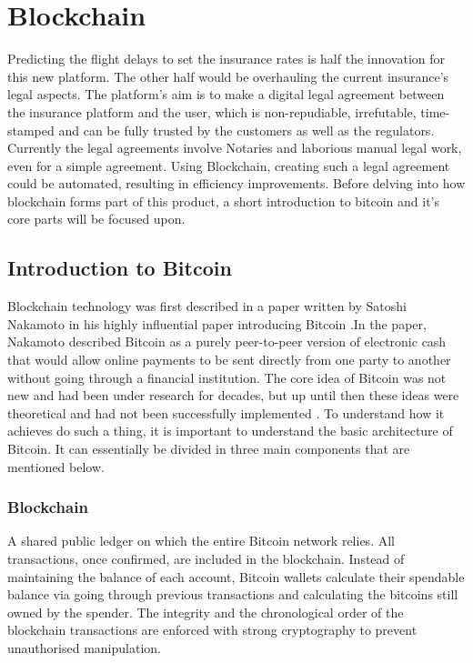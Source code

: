 \chapter{Blockchain}

Predicting the flight delays to set the insurance rates is half the innovation for this new platform. The other half would be overhauling the current insurance's legal aspects. The platform's aim is to make a digital legal agreement between the insurance platform and the user, which is non-repudiable, irrefutable, time-stamped and can be fully trusted by the customers as well as the regulators. Currently the legal agreements involve Notaries and laborious manual legal work, even for a simple agreement. Using Blockchain, creating such a legal agreement could be automated, resulting in efficiency improvements. Before delving into how blockchain forms part of this product, a short introduction to bitcoin and it's core parts will be focused upon. 

\section{Introduction to Bitcoin}
Blockchain technology was first described in a paper written by Satoshi Nakamoto in his highly influential paper introducing Bitcoin \cite{Nakamoto2008Bitcoin:System}.In the paper, Nakamoto described Bitcoin as a purely peer-to-peer version of electronic cash that would allow online payments to be sent directly from one party to another without going through a financial institution. The core idea of Bitcoin was not new and had been under research for decades, but up until then these ideas were theoretical and had not been successfully implemented \cite{Chaum1983BlindPayments}. To understand how it achieves do such a thing, it is important to understand the basic architecture of Bitcoin. It can essentially be divided in three main components that are mentioned below\cite{Economist2013HowWork}.

\subsection{Blockchain}
A shared public ledger on which the entire Bitcoin network relies. All transactions, once confirmed, are included in the blockchain. Instead of maintaining the balance of each account, Bitcoin wallets calculate their spendable balance via going through previous transactions and calculating the bitcoins  still owned by the spender. The integrity and the chronological order of the blockchain transactions are enforced with strong cryptography to prevent unauthorised manipulation. 

